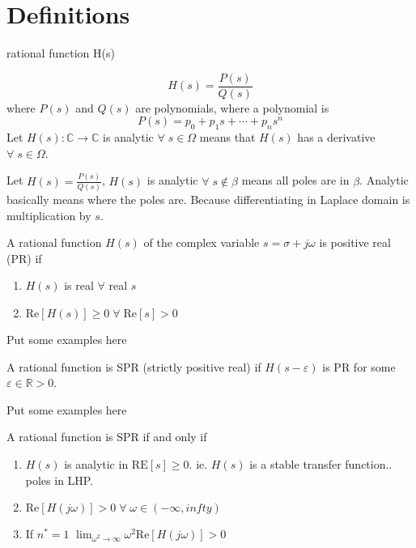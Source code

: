 \section{Definitions}
rational function H(s)

\begin{equation*}
  H(s)=\frac{P(s)}{Q(s)}
\end{equation*}
where $P(s)$ and $Q(s)$ are polynomials, where a polynomial is
\begin{equation*}
  P(s)=p_{0}+p_{1}s+\cdots+p_{n}s^{n}
\end{equation*}
Let $H(s):\mathbb{C}\rightarrow\mathbb{C}$ is analytic $\forall\;s\in\Omega$ means that $H(s)$ has a derivative $\forall\;s\in\Omega$.

\begin{example}
  Let $H(s)=\frac{P(s)}{Q(s)}$, $H(s)$ is analytic $\forall\;s\notin\beta$ means all poles are in $\beta$.
  Analytic basically means where the poles are.
  Because differentiating in Laplace domain is multiplication by $s$.
\end{example}

\begin{defn-dan}[2.6.1]
  A rational function $H(s)$ of the complex variable $s=\sigma+j\omega$ is positive real (PR) if
  \begin{enumerate}
    \item{$H(s)$ is real $\forall$ real $s$}
    \item{$\text{Re}[H(s)]\geq0\;\forall\;\text{Re}[s]>0$}
  \end{enumerate}
\end{defn-dan}

Put some examples here

\begin{defn-dan}[2.7]
  A rational function is SPR (strictly positive real) if $H(s-\varepsilon)$ is PR for some $\varepsilon\in\mathbb{R}>0$.
\end{defn-dan}

Put some examples here

\begin{defn-dan}[2.8]
  A rational function is SPR if and only if
  \begin{enumerate}
    \item{$H(s)$ is analytic in $\text{RE}[s]\geq0$.
    ie.
    $H(s)$ is a stable transfer function..
    poles in LHP.}
    \item{$\text{Re}[H(j\omega)]>0\;\forall\;\omega\in(-\infty,infty)$}
    \item{If $n^{*}=1$ $\lim_{\omega^{2}\rightarrow\infty}\omega^{2}\text{Re}[H(j\omega)]>0$}
  \end{enumerate}
\end{defn-dan}

